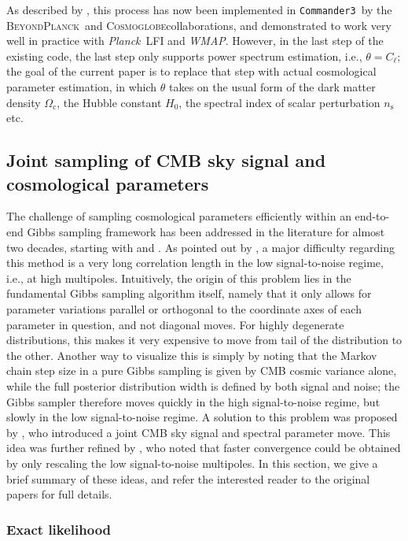 \documentclass[twocolumn]{../common/aa}
\def\WMAP{\emph{WMAP}}
\def\Planck{\emph{Planck}}
\def\commanderthree{\texttt{Commander3}}
\newcommand{\BP}{\textsc{BeyondPlanck}}
\newcommand{\Cosmoglobe}{\textsc{Cosmoglobe}}
\begin{document}
As described by \citet{bp01,watts2023_dr1}, this process has now been implemented in \commanderthree\ by the \BP\ and \Cosmoglobe collaborations, and demonstrated to work very well in practice with \Planck\ LFI and \WMAP. However, in the last step of the existing code, the last step only supports power spectrum estimation, i.e., $\theta = C_{\ell}$; the goal of the current paper is to replace that step with actual cosmological parameter estimation, in which $\theta$ takes on the usual form of the dark matter density $\Omega_\mathrm{c}$, the Hubble constant $H_0$, the spectral index of scalar perturbation $n_\mathrm{s}$ etc.

\subsection{Joint sampling of CMB sky signal and cosmological parameters}

The challenge of sampling cosmological parameters efficiently within an end-to-end Gibbs sampling framework has been addressed in the literature for almost two decades, starting with \citet{jewell2004} and \citet{wandelt2004}. As pointed out by \citet{eriksen:2004}, a major difficulty regarding this method is a very long correlation length in the low signal-to-noise regime, i.e., at high multipoles. Intuitively, the origin of this problem lies in the fundamental Gibbs sampling algorithm itself, namely that it only allows for parameter variations parallel or orthogonal to the coordinate axes of each parameter in question, and not diagonal moves. For highly degenerate distributions, this makes it very expensive to move from tail of the distribution to the other. Another way to visualize this is simply by noting that the Markov chain step size in a pure Gibbs sampling is given by CMB cosmic variance alone, while the full posterior distribution width is defined by both signal and noise; the Gibbs sampler therefore moves quickly in the high signal-to-noise regime, but slowly in the low signal-to-noise regime. A solution to this problem was proposed by \citet{jewell:2009}, who introduced a joint CMB sky signal and spectral parameter move. This idea was further refined by \citet{racine:2016}, who noted that faster convergence could be obtained by only rescaling the low signal-to-noise multipoles. In this section, we give a brief summary of these ideas, and refer the interested reader to the original papers for full details.

\subsubsection{Exact likelihood}
\label{sec:exact-likelihood}
\end{document}
